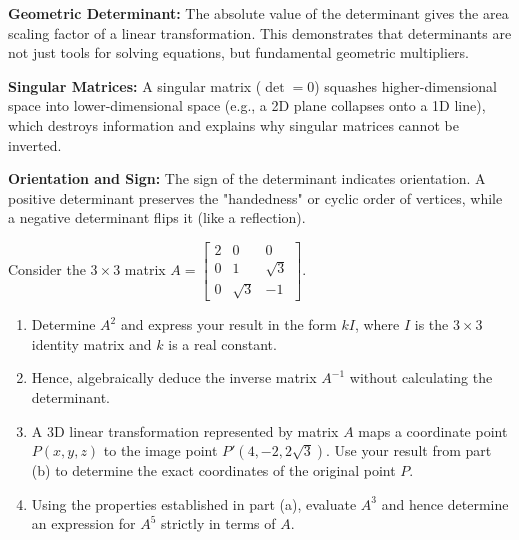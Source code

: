 \begin{solution}
\begin{center}
\end{center}
\end{solution}

\begin{takeaways}
\item \textbf{Geometric Determinant:} The absolute value of the determinant gives the area scaling factor of a linear transformation. This demonstrates that determinants are not just tools for solving equations, but fundamental geometric multipliers.
\item \textbf{Singular Matrices:} A singular matrix ($\det = 0$) squashes higher-dimensional space into lower-dimensional space (e.g., a 2D plane collapses onto a 1D line), which destroys information and explains why singular matrices cannot be inverted.
\item \textbf{Orientation and Sign:} The sign of the determinant indicates orientation. A positive determinant preserves the "handedness" or cyclic order of vertices, while a negative determinant flips it (like a reflection).
\end{takeaways}


\begin{problem}
Consider the $3 \times 3$ matrix $A = \begin{bmatrix} 2 & 0 & 0 \\ 0 & 1 & \sqrt{3} \\ 0 & \sqrt{3} & -1 \end{bmatrix}$.

\begin{enumerate}[label=\textbf{(\alph*)}]
    \item Determine $A^2$ and express your result in the form $kI$, where $I$ is the $3 \times 3$ identity matrix and $k$ is a real constant.
    \item Hence, algebraically deduce the inverse matrix $A^{-1}$ without calculating the determinant.
    \item A 3D linear transformation represented by matrix $A$ maps a coordinate point $P(x, y, z)$ to the image point $P'(4, -2, 2\sqrt{3})$. Use your result from part (b) to determine the exact coordinates of the original point $P$.
    \item Using the properties established in part (a), evaluate $A^3$ and hence determine an expression for $A^5$ strictly in terms of $A$.
\end{enumerate}
\end{problem}


